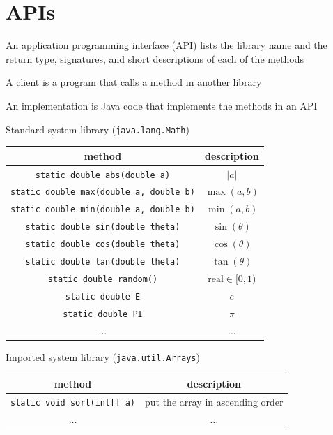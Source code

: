 \documentclass[8pt,a4paper,compress]{beamer}
\begin{document}
\section{APIs}
\begin{frame}[fragile]
\pause

An application programming interface (API) lists the library name and the return type, signatures, and short descriptions of each of the methods

\pause\bigskip

A client is a program that calls a method in another library

\pause\bigskip

An implementation is Java code that implements the methods in an API

\pause\bigskip

Standard system library (\lstinline{java.lang.Math})
\begin{center}
\begin{tabular}{cc}
method & description \\ \hline
\lstinline$static double abs(double a)$  & $|a|$ \\
\lstinline$static double max(double a, double b)$  & $\max(a, b)$ \\
\lstinline$static double min(double a, double b)$  & $\min(a, b)$ \\
\lstinline$static double sin(double theta)$  & $\sin(\theta)$ \\
\lstinline$static double cos(double theta)$  & $\cos(\theta)$ \\
\lstinline$static double tan(double theta)$  & $\tan(\theta)$ \\
\lstinline$static double random()$ & $\text{real} \in [0, 1)$ \\
\lstinline$static double E$ & $e$ \\
\lstinline$static double PI$ & $\pi$ \\
$\dots$ & $\dots$ 
\end{tabular} 
\end{center}

\pause\bigskip

Imported system library (\lstinline{java.util.Arrays})
\begin{center}
\begin{tabular}{cc}
method & description \\ \hline
\lstinline$static void sort(int[] a)$ & put the array in ascending order \\
$\dots$ & $\dots$ 
\end{tabular} 
\end{center}
\end{frame}
\end{document}
